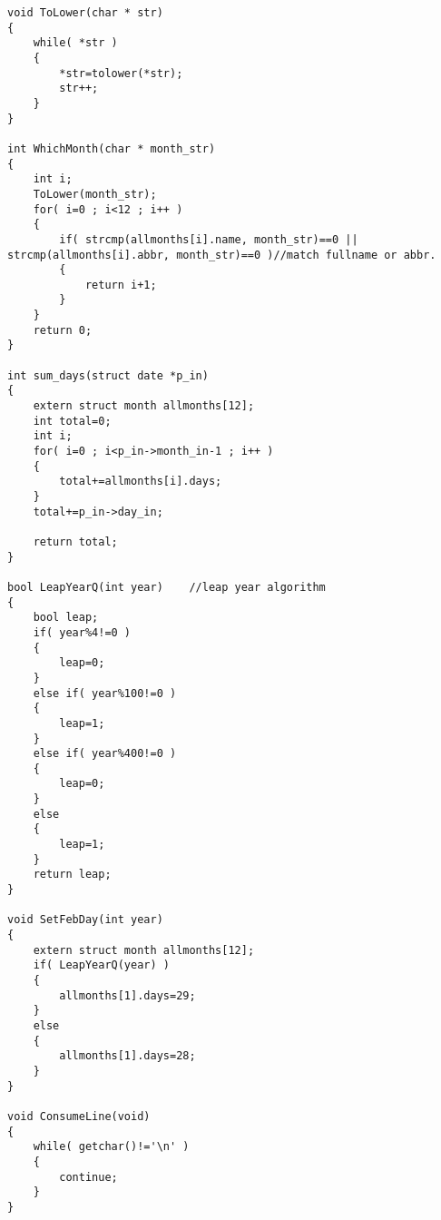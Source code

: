 \begin{solution}
\begin{verbatim}
void ToLower(char * str)
{
	while( *str )
	{
		*str=tolower(*str);
		str++;
	}
}

int WhichMonth(char * month_str)
{
	int i;
	ToLower(month_str);
	for( i=0 ; i<12 ; i++ )
	{
		if( strcmp(allmonths[i].name, month_str)==0 || strcmp(allmonths[i].abbr, month_str)==0 )//match fullname or abbr.
		{
			return i+1;
		}
	}
	return 0;
}

int sum_days(struct date *p_in)
{
	extern struct month allmonths[12];
	int total=0;
	int i;
	for( i=0 ; i<p_in->month_in-1 ; i++ )
	{
		total+=allmonths[i].days;
	}
	total+=p_in->day_in;

	return total;
}

bool LeapYearQ(int year)	//leap year algorithm
{
	bool leap;
	if( year%4!=0 )
	{
		leap=0;
	}
	else if( year%100!=0 )
	{
		leap=1;
	}
	else if( year%400!=0 )
	{
		leap=0;
	}
	else
	{
		leap=1;
	}
	return leap;
}

void SetFebDay(int year)
{
	extern struct month allmonths[12];
	if( LeapYearQ(year) )
	{
		allmonths[1].days=29;
	}
	else
	{
		allmonths[1].days=28;
	}
}

void ConsumeLine(void)
{
	while( getchar()!='\n' )
	{
		continue;
	}
}
  \end{verbatim}
\end{solution}

